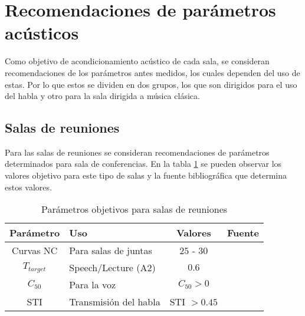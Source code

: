 \section{Recomendaciones de parámetros acústicos} \label{secc: Recomendaciones}
Como objetivo de acondicionamiento acústico de cada sala, se consideran recomendaciones de los parámetros antes medidos, los cuales dependen del uso de estas. Por lo que estos se dividen en dos grupos, los que son dirigidos para el uso del habla y otro para la sala dirigida a música clásica.
\subsection{Salas de reuniones}
Para las salas de reuniones se consideran recomendaciones de parámetros determinados para sala de conferencias. En la tabla \ref{tab: parametros objetivos sala de reuniones} se pueden observar los valores objetivo para este tipo de salas y la fuente bibliográfica que determina estos valores.
\begin{table}[H]
    \centering
    \begin{tabular}{|c|l|c|l|}
    \hline
    \textbf{Parámetro} & \textbf{Uso }            & \textbf{Valores}    & \textbf{Fuente}  \\ \hline
    Curvas NC          & Para salas de juntas     & $25$ - $30$         & \cite{Recuero} \\ \hline
    $T_{target}$       & Speech/Lecture (A2)      & $0.6$               & \cite{DIN18041} \\ \hline
    $C_{50}$           & Para la voz              &  $C_{50}>0$         & \cite{marshall1994}  \\ \hline  
    STI & Transmisión del habla & STI $>0.45$ & \cite{ISO9921}\\ \hline
    \end{tabular}
    \caption{Parámetros objetivos para salas de reuniones}
    \label{tab: parametros objetivos sala de reuniones}
\end{table}
